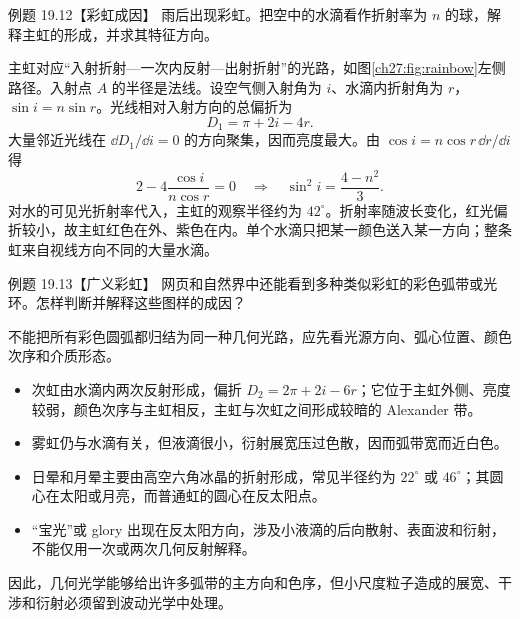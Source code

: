 \RainbowDiagram

\begin{origexamplebox}{例题 19.12【彩虹成因】}
雨后出现彩虹。把空中的水滴看作折射率为 $n$ 的球，解释主虹的形成，并求其特征方向。
\end{origexamplebox}
\begin{xesolution}
主虹对应“入射折射—一次内反射—出射折射”的光路，如图\ref{ch27:fig:rainbow}左侧路径。入射点 $A$ 的半径是法线。设空气侧入射角为 $i$、水滴内折射角为 $r$，$\sin i=n\sin r$。光线相对入射方向的总偏折为
\[
 D_1=\pi+2i-4r.
\]
大量邻近光线在 $\dd D_1/\dd i=0$ 的方向聚集，因而亮度最大。由 $\cos i=n\cos r\,\dd r/\dd i$ 得
\[
 2-4\frac{\cos i}{n\cos r}=0
 \quad\Longrightarrow\quad
 \sin^2i=\frac{4-n^2}{3}.
\]
对水的可见光折射率代入，主虹的观察半径约为 $42^\circ$。折射率随波长变化，红光偏折较小，故主虹红色在外、紫色在内。单个水滴只把某一颜色送入某一方向；整条虹来自视线方向不同的大量水滴。
\end{xesolution}

\begin{origexamplebox}{例题 19.13【广义彩虹】}
网页和自然界中还能看到多种类似彩虹的彩色弧带或光环。怎样判断并解释这些图样的成因？
\end{origexamplebox}
\begin{xesolution}
不能把所有彩色圆弧都归结为同一种几何光路，应先看光源方向、弧心位置、颜色次序和介质形态。
\begin{itemize}
  \item 次虹由水滴内两次反射形成，偏折 $D_2=2\pi+2i-6r$；它位于主虹外侧、亮度较弱，颜色次序与主虹相反，主虹与次虹之间形成较暗的 Alexander 带。
  \item 雾虹仍与水滴有关，但液滴很小，衍射展宽压过色散，因而弧带宽而近白色。
  \item 日晕和月晕主要由高空六角冰晶的折射形成，常见半径约为 $22^\circ$ 或 $46^\circ$；其圆心在太阳或月亮，而普通虹的圆心在反太阳点。
  \item “宝光”或 glory 出现在反太阳方向，涉及小液滴的后向散射、表面波和衍射，不能仅用一次或两次几何反射解释。
\end{itemize}
因此，几何光学能够给出许多弧带的主方向和色序，但小尺度粒子造成的展宽、干涉和衍射必须留到波动光学中处理。
\end{xesolution}
